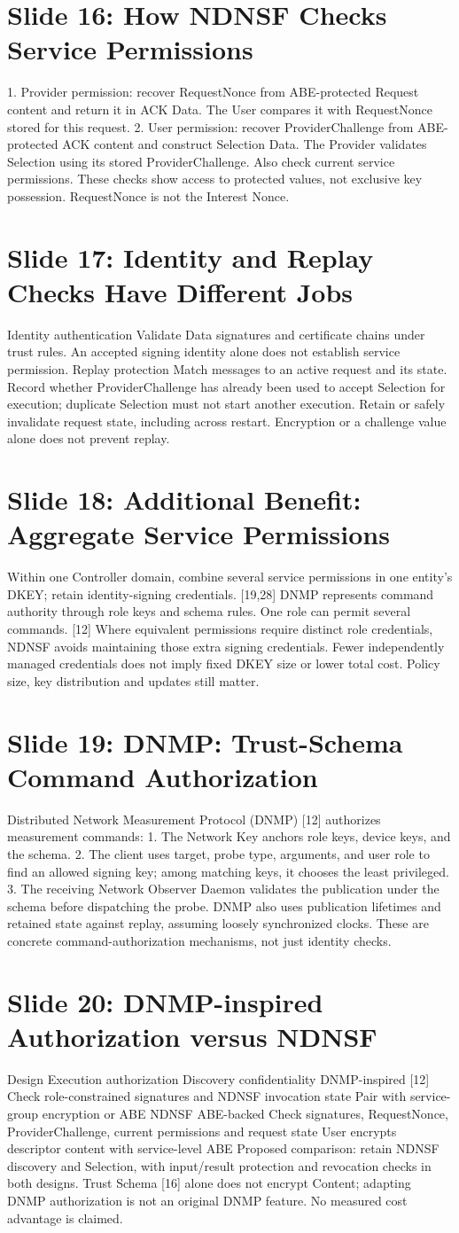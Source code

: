 \documentclass[11pt]{article}
\newcommand{\slideentry}[3]{\section*{Slide #1: #2}#3\par}
\begin{document}
\slideentry{16}{How NDNSF Checks Service Permissions}{
1. Provider permission: recover RequestNonce from ABE-protected Request content and return it in ACK Data. The User compares it with RequestNonce stored for this request. 2. User permission: recover ProviderChallenge from ABE-protected ACK content and construct Selection Data. The Provider validates Selection using its stored ProviderChallenge. Also check current service permissions. These checks show access to protected values, not exclusive key possession. RequestNonce is not the Interest Nonce.
}
\slideentry{17}{Identity and Replay Checks Have Different Jobs}{
Identity authentication Validate Data signatures and certificate chains under trust rules. An accepted signing identity alone does not establish service permission. Replay protection Match messages to an active request and its state. Record whether ProviderChallenge has already been used to accept Selection for execution; duplicate Selection must not start another execution. Retain or safely invalidate request state, including across restart. Encryption or a challenge value alone does not prevent replay.
}
\slideentry{18}{Additional Benefit: Aggregate Service Permissions}{
Within one Controller domain, combine several service permissions in one entity’s DKEY; retain identity-signing credentials. [19,28] DNMP represents command authority through role keys and schema rules. One role can permit several commands. [12] Where equivalent permissions require distinct role credentials, NDNSF avoids maintaining those extra signing credentials. Fewer independently managed credentials does not imply fixed DKEY size or lower total cost. Policy size, key distribution and updates still matter.
}
\slideentry{19}{DNMP: Trust-Schema Command Authorization}{
Distributed Network Measurement Protocol (DNMP) [12] authorizes measurement commands: 1. The Network Key anchors role keys, device keys, and the schema. 2. The client uses target, probe type, arguments, and user role to find an allowed signing key; among matching keys, it chooses the least privileged. 3. The receiving Network Observer Daemon validates the publication under the schema before dispatching the probe. DNMP also uses publication lifetimes and retained state against replay, assuming loosely synchronized clocks. These are concrete command-authorization mechanisms, not just identity checks.
}
\slideentry{20}{DNMP-inspired Authorization versus NDNSF}{
Design Execution authorization Discovery confidentiality DNMP-inspired [12] Check role-constrained signatures and NDNSF invocation state Pair with service-group encryption or ABE NDNSF ABE-backed Check signatures, RequestNonce, ProviderChallenge, current permissions and request state User encrypts descriptor content with service-level ABE Proposed comparison: retain NDNSF discovery and Selection, with input/result protection and revocation checks in both designs. Trust Schema [16] alone does not encrypt Content; adapting DNMP authorization is not an original DNMP feature. No measured cost advantage is claimed.
}
\end{document}
